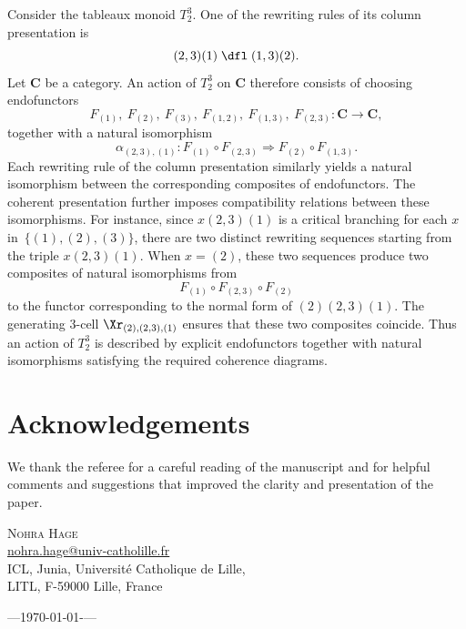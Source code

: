 \documentclass[a4paper, twoside, 11pt, english]{article}
\begin{document}
\begin{example}
Consider the tableaux monoid $T_2^3$.
One of the rewriting rules of its column presentation is
\[
(2,3)(1)\;\dfl\;(1,3)(2).
\]
Let $\mathbf C$ be a category.
An action of $T_2^3$ on $\mathbf C$ therefore consists of choosing
endofunctors
\[
F_{(1)},\ F_{(2)},\ F_{(3)},\
F_{(1,2)},\ F_{(1,3)},\ F_{(2,3)} :
\mathbf C \to \mathbf C,
\]
together with a natural isomorphism
\[
\alpha_{(2,3),(1)}:
F_{(1)}\circ F_{(2,3)}
\Rightarrow
F_{(2)}\circ F_{(1,3)}.
\]
Each rewriting rule of the column presentation similarly yields a
natural isomorphism between the corresponding composites of
endofunctors.
The coherent presentation further imposes compatibility relations
between these isomorphisms.
For instance, since $x(2,3)(1)$ is a critical branching for each
$x$ in~$\{(1),(2),(3)\}$, there are two distinct rewriting sequences
starting from the triple $x(2,3)(1)$.
When $x=(2)$, these two sequences produce two composites of natural
isomorphisms from
\[
F_{(1)}\circ F_{(2,3)}\circ F_{(2)}
\]
to the functor corresponding to the normal form of $(2)(2,3)(1)$.
The generating $3$-cell $\Xr_{(2),(2,3),(1)}$ ensures that these two
composites coincide.
Thus an action of $T_2^3$ is described by explicit endofunctors together
with natural isomorphisms satisfying the required coherence diagrams.
\end{example}


\section*{Acknowledgements}
We thank the referee for a careful reading of the manuscript
and for helpful comments and suggestions that improved
the clarity and presentation of the paper.

\begin{small}
\renewcommand{\refname}{\Large\textsc{References}}


\end{small}

\quad

\vfill
\begin{flushright}
\begin{small}
\noindent \textsc{Nohra Hage} \\
\url{nohra.hage@univ-catholille.fr} \\
ICL, Junia, Université Catholique de Lille,\\
 LITL, F-59000 Lille, France\\
\end{small}
\end{flushright}

\vspace{0.25cm}

\begin{small}---\;\;\today\;\;-\;\;\hhmm\;\;---\end{small} \hfill
\end{document}
